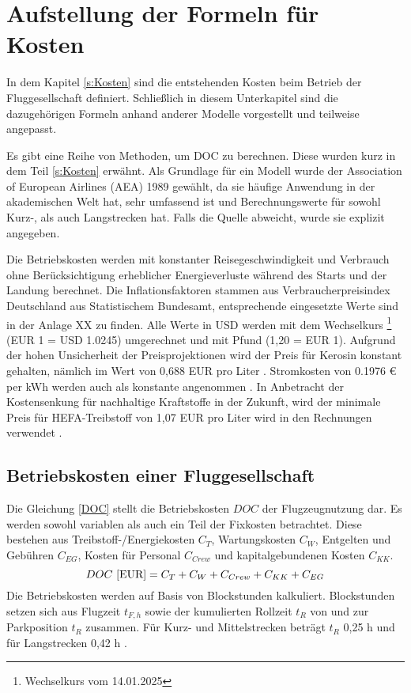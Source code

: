 \section{Aufstellung der Formeln für Kosten}
\label{s:Aufstellung der Formeln für Kosten}

In dem Kapitel \ref{s:Kosten} sind die entstehenden Kosten beim Betrieb der Fluggesellschaft definiert.
Schließlich in diesem Unterkapitel sind die dazugehörigen Formeln anhand anderer Modelle vorgestellt und teilweise angepasst. 

Es gibt eine Reihe von Methoden, um DOC zu berechnen. Diese wurden kurz in dem Teil \ref{s:Kosten} erwähnt.
Als Grundlage für ein Modell wurde der Association of European Airlines (AEA) 1989 gewählt, da sie häufige Anwendung 
in der akademischen Welt hat, sehr umfassend ist und Berechnungswerte für sowohl Kurz-, als auch Langstrecken hat. 
Falls die Quelle abweicht, wurde sie explizit angegeben.

Die Betriebskosten werden mit konstanter Reisegeschwindigkeit und Verbrauch ohne Berücksichtigung erheblicher 
Energieverluste während des Starts und der Landung berechnet. 
Die Inflationsfaktoren stammen aus Verbraucherpreisindex Deutschland aus Statistischem Bundesamt, entsprechende eingesetzte Werte sind in der Anlage XX zu finden.
Alle Werte in USD werden mit dem Wechselkurs \footnote{Wechselkurs vom 14.01.2025} (EUR 1 = USD 1.0245) umgerechnet und mit Pfund (1,20 = EUR 1).
Aufgrund der hohen Unsicherheit der Preisprojektionen wird der Preis für Kerosin konstant gehalten, nämlich im Wert von
0,688 EUR pro Liter \cite{iata_industry_statistics_2024}. Stromkosten von 0.1976 € per kWh werden auch als konstante angenommen \cite{eurostat_nrg_pc_205}.
In Anbetracht der Kostensenkung für nachhaltige Kraftstoffe in der Zukunft, wird der minimale Preis für HEFA-Treibstoff 
von 1,07 EUR pro Liter wird in den Rechnungen verwendet \cite{watson2024sustainable}.
%
%
\subsection{Betriebskosten einer Fluggesellschaft}

Die Gleichung \eqref{DOC} stellt die Betriebskosten $DOC$ der Flugzeugnutzung dar. Es werden sowohl variablen als auch ein 
Teil der Fixkosten betrachtet.
Diese bestehen aus Treibstoff-/Energiekosten $C_T$, 
Wartungskosten $C_W$, Entgelten und Gebühren $C_{EG}$, Kosten für Personal $C_{Crew}$ und kapitalgebundenen Kosten $C_{KK}$.
%
\begin{equation}
     {DOC ~[\text{EUR}]} = C_T + C_W + C_{Crew} + C_{KK} + C_{EG} \\
     \label{DOC}
  \end{equation}
%
Die Betriebskosten werden auf Basis von Blockstunden kalkuliert. 
Blockstunden setzen sich aus Flugzeit $t_{F,h}$ sowie der kumulierten Rollzeit $t_{R}$ von und zur Parkposition $t_{R}$ zusammen. 
Für Kurz- und Mittelstrecken beträgt $t_{R}$ {0,25 h} und für Langstrecken 0,42 h \cite{scholz_design_evaluation_doc}.


